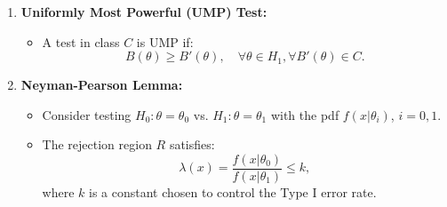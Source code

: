\documentclass{article}
\begin{document}
\begin{enumerate}
    \item \textbf{Uniformly Most Powerful (UMP) Test:}
    \begin{itemize}
        \item A test in class \(C\) is UMP if:
        \[
        B(\theta) \geq B'(\theta), \quad \forall \theta \in H_1, \forall B'(\theta) \in C.
        \]
    \end{itemize}

    \item \textbf{Neyman-Pearson Lemma:}
    \begin{itemize}
        \item Consider testing \(H_0: \theta = \theta_0\) vs. \(H_1: \theta = \theta_1\) with the pdf \(f(x|\theta_i)\), \(i = 0, 1\).
        \item The rejection region \(R\) satisfies:
        \[
        \lambda(x) = \frac{f(x|\theta_0)}{f(x|\theta_1)} \leq k,
        \]
        where \(k\) is a constant chosen to control the Type I error rate.
    \end{itemize}
\end{enumerate}

\end{document}
